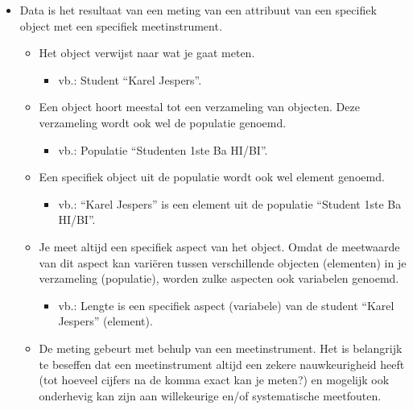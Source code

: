 \documentclass[]{memoir}
\providecommand{\tightlist}{%
  \setlength{\itemsep}{0pt}\setlength{\parskip}{0pt}}
\begin{document}
\begin{itemize}
\tightlist
\item
  Data is het resultaat van een meting van een attribuut van een
  specifiek object met een specifiek meetinstrument.

  \begin{itemize}
  \tightlist
  \item
    Het object verwijst naar wat je gaat meten.

    \begin{itemize}
    \tightlist
    \item
      vb.: Student ``Karel Jespers''.
    \end{itemize}
  \item
    Een object hoort meestal tot een verzameling van objecten. Deze
    verzameling wordt ook wel de populatie genoemd.

    \begin{itemize}
    \tightlist
    \item
      vb.: Populatie ``Studenten 1ste Ba HI/BI''.
    \end{itemize}
  \item
    Een specifiek object uit de populatie wordt ook wel element genoemd.

    \begin{itemize}
    \tightlist
    \item
      vb.: ``Karel Jespers'' is een element uit de populatie ``Student
      1ste Ba HI/BI''.
    \end{itemize}
  \item
    Je meet altijd een specifiek aspect van het object. Omdat de
    meetwaarde van dit aspect kan variëren tussen verschillende objecten
    (elementen) in je verzameling (populatie), worden zulke aspecten ook
    variabelen genoemd.

    \begin{itemize}
    \tightlist
    \item
      vb.: Lengte is een specifiek aspect (variabele) van de student
      ``Karel Jespers'' (element).
    \end{itemize}
  \item
    De meting gebeurt met behulp van een meetinstrument. Het is
    belangrijk te beseffen dat een meetinstrument altijd een zekere
    nauwkeurigheid heeft (tot hoeveel cijfers na de komma exact kan je
    meten?) en mogelijk ook onderhevig kan zijn aan willekeurige en/of
    systematische meetfouten.


\end{itemize}
\end{itemize}
\end{document}

